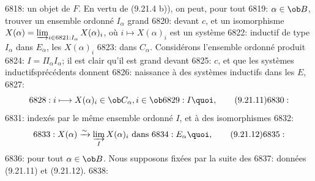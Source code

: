 6818: un objet de $F$. En vertu de (9.21.4 b)), on peut, pour tout
6819: $\alpha\in \ob B$, trouver un ensemble ordonné $I_{\alpha}$ grand
6820: devant $c$, et un isomorphisme $X(\alpha)=\varinjlim_{i\in
6821: I_{\alpha}} X(\alpha)_i$, où $i\mapsto X(\alpha)_i$ est un système
6822: inductif de type $I_{\alpha}$ dans $E_{\alpha}$, les $X(\alpha)_i$
6823: dans $C_{\alpha}$. Considérons l'ensemble ordonné produit
6824: $I=\Pi_{\alpha} I_{\alpha}$; il est clair qu'il est grand devant
6825: $c$, et que les systèmes inductifs\pageoriginale précédents donnent
6826: naissance à des systèmes inductifs dans les $E$,
6827: \begin{equation}
6828: i\longmapsto X(\alpha)_i\in \ob C_{\alpha}, i\in \ob
6829: I{\quoi},\tag{9.21.11}
6830: \end{equation}
6831: indexés par le même ensemble ordonné $I$, et à des isomorphismes
6832: \begin{equation}
6833: X(\alpha)\xrightarrow{\sim}\varinjlim_I X(\alpha)_i\mbox{ dans }
6834: E_{\alpha}{\quoi},\tag{9.21.12}
6835: \end{equation}
6836: pour tout $\alpha\in \ob B$. Nous supposons fixées par la suite des
6837: données (9.21.11) et (9.21.12).
6838: 
